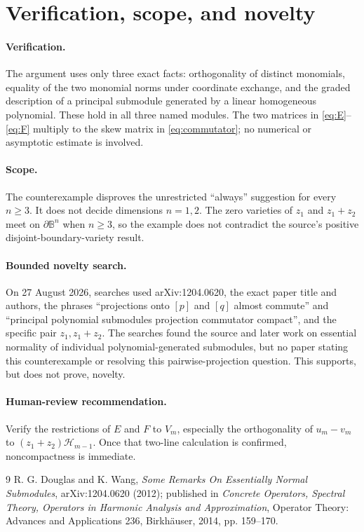 \documentclass[11pt]{article}
\newcommand{\B}{\mathbb B}
\begin{document}
\section{Verification, scope, and novelty}

\paragraph{Verification.}
The argument uses only three exact facts: orthogonality of distinct monomials,
equality of the two monomial norms under coordinate exchange, and the graded
description of a principal submodule generated by a linear homogeneous
polynomial. These hold in all three named modules. The two matrices in
\eqref{eq:E}--\eqref{eq:F} multiply to the skew matrix in
\eqref{eq:commutator}; no numerical or asymptotic estimate is involved.

\paragraph{Scope.}
The counterexample disproves the unrestricted ``always'' suggestion for every
$n\ge3$. It does not decide dimensions $n=1,2$. The zero varieties of $z_1$
and $z_1+z_2$ meet on $\partial\B^n$ when $n\ge3$, so the example does not
contradict the source's positive disjoint-boundary-variety result.

\paragraph{Bounded novelty search.}
On 27 August 2026, searches used arXiv:1204.0620, the exact paper title and
authors, the phrases ``projections onto $[p]$ and $[q]$ almost commute'' and
``principal polynomial submodules projection commutator compact'', and the
specific pair $z_1,z_1+z_2$. The searches found the source and later work on
essential normality of individual polynomial-generated submodules, but no
paper stating this counterexample or resolving this pairwise-projection
question. This supports, but does not prove, novelty.

\paragraph{Human-review recommendation.}
Verify the restrictions of $E$ and $F$ to $V_m$, especially the orthogonality
of $u_m-v_m$ to $(z_1+z_2)\mathcal H_{m-1}$. Once that two-line calculation is
confirmed, noncompactness is immediate.

\begin{thebibliography}{9}
R. G. Douglas and K. Wang,
\emph{Some Remarks On Essentially Normal Submodules},
arXiv:1204.0620 (2012); published in \emph{Concrete Operators, Spectral
Theory, Operators in Harmonic Analysis and Approximation}, Operator Theory:
Advances and Applications 236, Birkh\"auser, 2014, pp. 159--170.
\end{thebibliography}
\end{document}
